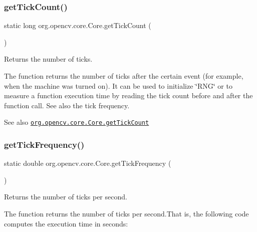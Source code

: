\subsubsection{\texorpdfstring{get\+Tick\+Count()}{getTickCount()}}
{\footnotesize\ttfamily static long org.\+opencv.\+core.\+Core.\+get\+Tick\+Count (\begin{DoxyParamCaption}{ }\end{DoxyParamCaption})\hspace{0.3cm}{\ttfamily [static]}}

Returns the number of ticks.

The function returns the number of ticks after the certain event (for example, when the machine was turned on). It can be used to initialize \char`\"{}\+R\+N\+G\char`\"{} or to measure a function execution time by reading the tick count before and after the function call. See also the tick frequency.

\begin{DoxySeeAlso}{See also}
\href{http://docs.opencv.org/modules/core/doc/utility_and_system_functions_and_macros.html#gettickcount}{\tt org.\+opencv.\+core.\+Core.\+get\+Tick\+Count} 
\end{DoxySeeAlso}
\mbox{\label{classorg_1_1opencv_1_1core_1_1_core_afc3677eba8a0186c9b92ebfa096301ec}} 
\subsubsection{\texorpdfstring{get\+Tick\+Frequency()}{getTickFrequency()}}
{\footnotesize\ttfamily static double org.\+opencv.\+core.\+Core.\+get\+Tick\+Frequency (\begin{DoxyParamCaption}{ }\end{DoxyParamCaption})\hspace{0.3cm}{\ttfamily [static]}}

Returns the number of ticks per second.

The function returns the number of ticks per second.\+That is, the following code computes the execution time in seconds\+: {\ttfamily }

{\ttfamily }

{\ttfamily }


